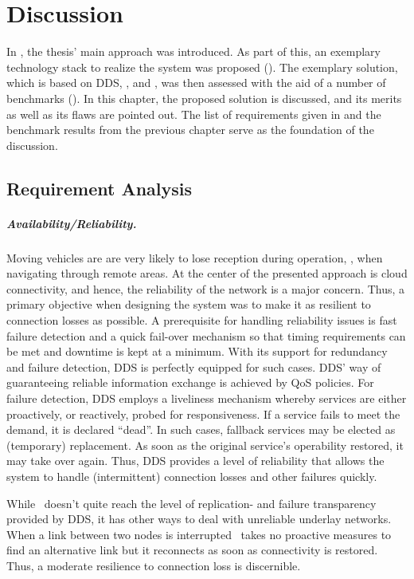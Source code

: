 \chapter{Discussion}\label{chapter:discussion}
In , the thesis' main approach was introduced. As part of this, an exemplary technology stack to realize the system was proposed (\cf {}). The exemplary solution, which is based on DDS, \docker , and \wnet , was then assessed with the aid of a number of benchmarks (\cf {}). In this chapter, the proposed solution is discussed, and its merits as well as its flaws are pointed out. The list of requirements given in  and the benchmark results from the previous chapter serve as the foundation of the discussion.


\section{Requirement Analysis}

\paragraph{Availability/Reliability.}
Moving vehicles are are very likely to lose reception during operation, \eg , when navigating through remote areas. At the center of the presented approach is cloud connectivity, and hence, the reliability of the network is a major concern. Thus, a primary objective when designing the system was to make it as resilient to connection losses as possible. A prerequisite for handling reliability issues is fast failure detection and a quick fail-over mechanism so that timing requirements can be met and downtime is kept at a minimum. With its support for redundancy and failure detection, DDS is perfectly equipped for such cases. DDS' way of guaranteeing reliable information exchange is achieved by QoS policies. For failure detection, DDS employs a liveliness mechanism whereby services are either proactively, or reactively, probed for responsiveness. If a service fails to meet the demand, it is declared ``dead''. In such cases, fallback services may be elected as (temporary) replacement. As soon as the original service's operability restored, it may take over again. Thus, DDS provides a level of reliability that allows the system to handle (intermittent) connection losses and other failures quickly.

While \wnet\ doesn't quite reach the level of replication- and failure transparency provided by DDS, it has other ways to deal with unreliable underlay networks. When a link between two nodes is interrupted \weave\ takes no proactive measures to find an alternative link but it reconnects as soon as connectivity is restored. Thus, a moderate resilience to connection loss is discernible.

